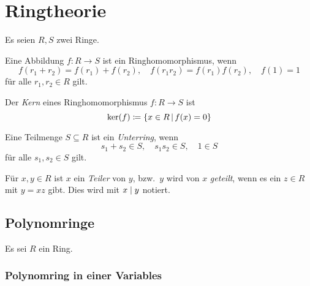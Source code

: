 \chapter{Ringtheorie}

Es seien $R, S$ zwei Ringe.

\begin{definition}
  Eine Abbildung $f \colon R \to S$ ist ein Ringhomomorphismus, wenn
  \[
      f(r_1 + r_2)
    = f(r_1) + f(r_2),
    \quad
      f(r_1 r_2)
    = f(r_1) f(r_2),
    \quad
      f(1) = 1
  \]
  für alle $r_1, r_2 \in R$ gilt.
\end{definition}

\begin{definition}
  Der \emph{Kern} eines Ringhomomorphismus $f \colon R \to S$ ist
  \[
              \ker(f)
    \defined  \{x \in R \suchthat f(x) = 0\}
  \]
\end{definition}

\begin{definition}
  Eine Teilmenge $S \subseteq R$ ist ein \emph{Unterring}, wenn
  \[
    s_1 + s_2 \in S,
    \quad
    s_1 s_2 \in S,
    \quad
    1 \in S
  \]
  für alle $s_1, s_2 \in S$ gilt.
\end{definition}

\begin{definition}
  Für $x, y \in R$ ist $x$ ein \emph{Teiler} von $y$, bzw.\ $y$ wird von $x$ \emph{geteilt}, wenn es ein $z \in R$ mit $y = xz$ gibt.
  Dies wird mit $x \mathrel{|} y$ notiert.
\end{definition}





\section{Polynomringe}

Es sei $R$ ein Ring.



\subsection{Polynomring in einer Variables}

